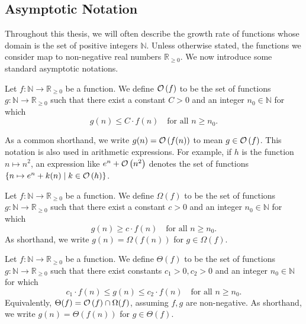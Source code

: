 \subsection{Asymptotic Notation}\label{subsec:asymptotic-notation} %

Throughout this thesis, we will often describe the growth rate of functions whose domain is the set of positive integers $\mathbb{N}$. Unless otherwise stated, the functions we consider map to non-negative real numbers $\mathbb{R}_{\ge 0}$. We now introduce some standard asymptotic notations.

\begin{definition}
    Let $f: \mathbb{N} \to \mathbb{R}_{\ge 0}$ be a function.
    We define $\mathcal{O}\left(f\right)$ to be the set of functions $g: \mathbb{N} \to \mathbb{R}_{\ge 0}$ such that there exist a constant $C > 0$ and an integer $n_0 \in \mathbb{N}$ for which
    \[
        g(n) \leq C \cdot f(n) \quad \text{for all } n \geq n_0.
    \]
\end{definition}

As a common shorthand, we write $g(n) = \mathcal{O}\left(f(n)\right)$ to mean $g \in \mathcal{O}\left(f\right)$.
This notation is also used in arithmetic expressions.
For example, if $h$ is the function $n \mapsto n^2$,
an expression like $e^n + \mathcal{O}\left(n^2\right)$ denotes the set of functions $\{n \mapsto e^n + k(n) \mid k \in \mathcal{O}\left(h\right)\}$.

\begin{definition}
    Let $f: \mathbb{N} \to \mathbb{R}_{\ge 0}$ be a function.
    We define $\Omega(f)$ to be the set of functions $g: \mathbb{N} \to \mathbb{R}_{\ge 0}$ such that there exist a constant $c > 0$ and an integer $n_0 \in \mathbb{N}$ for which
    \[
        g(n) \geq c \cdot f(n) \quad \text{for all } n \geq n_0.
    \]
    As shorthand, we write $g(n) = \Omega(f(n))$ for $g \in \Omega(f)$.
\end{definition}

\begin{definition}
    Let $f: \mathbb{N} \to \mathbb{R}_{\ge 0}$ be a function.
    We define $\Theta(f)$ to be the set of functions $g: \mathbb{N} \to \mathbb{R}_{\ge 0}$ such that there exist constants $c_1 > 0, c_2 > 0$ and an integer $n_0 \in \mathbb{N}$ for which
    \[
        c_1 \cdot f(n) \leq g(n) \leq c_2 \cdot f(n) \quad \text{for all } n \geq n_0.
    \]
    Equivalently, $\Theta(f) = \mathcal{O}\left(f\right) \cap \Omega(f)$, assuming $f, g$ are non-negative.
    As shorthand, we write $g(n) = \Theta(f(n))$ for $g \in \Theta(f)$.
\end{definition}

